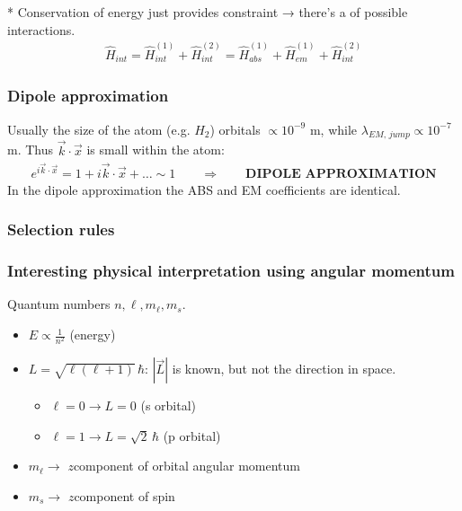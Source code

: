 \documentclass[letterpaper,10pt,english]{jupyterBook}
\begin{document}
\sphinxAtStartPar
* Conservation of energy just provides  constraint → there’s a  of possible interactions.
\begin{equation*}
\begin{split}
\hat H_{int}=\hat H^{(1)}_{int}+\hat H^{(2)}_{int}=\hat H^{(1)}_{abs}+\hat H^{(1)}_{em}+\hat H^{(2)}_{int}
\end{split}
\end{equation*}\subsubsection*{Dipole approximation}

\sphinxAtStartPar
Usually the size of the atom (e.g. \(H_2\)) orbitals \(\propto10^{-9}\) m, while \(\lambda_{EM,\,jump}\propto10^{-7}\) m. Thus \(\vec k\cdot\vec x\) is small within the atom:
\begin{equation*}
\begin{split}
e^{i\vec k\cdot\vec x}=1+i\vec k\cdot\vec x+\dots\sim1\qquad\Rightarrow\qquad\textbf{DIPOLE APPROXIMATION}
\end{split}
\end{equation*}
\sphinxAtStartPar
In the dipole approximation the ABS and EM coefficients are identical.
\subsubsection*{Selection rules}
\subsubsection*{Interesting physical interpretation using angular momentum}

\sphinxAtStartPar
Quantum numbers \(n,\ell,m_\ell,m_s\).
\begin{itemize}
\item {} 
\sphinxAtStartPar
\(E\propto\frac1{n^2}\) (energy)

\item {} 
\sphinxAtStartPar
\(L=\sqrt{\ell(\ell+1)}\,\hbar\): \(|\vec L|\) is known, but not the direction in space.
\begin{itemize}
\item {} 
\sphinxAtStartPar
\(\ell=0\to L=0\) (s orbital)

\item {} 
\sphinxAtStartPar
\(\ell=1\to L=\sqrt2\,\hbar\) (p orbital)

\end{itemize}

\item {} 
\sphinxAtStartPar
\(m_\ell\to\) \(z\)\sphinxhyphen{}component of orbital angular momentum

\item {} 
\sphinxAtStartPar
\(m_s\to\) \(z\)\sphinxhyphen{}component of spin

\end{itemize}
\end{document}

